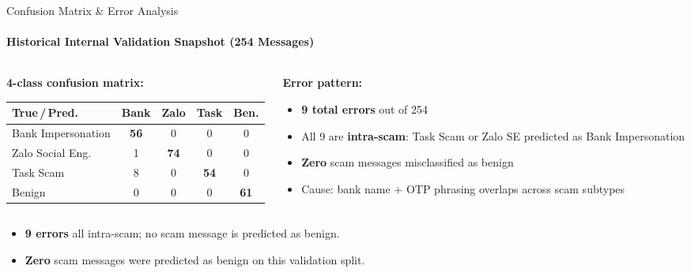 \begin{frame}{Confusion Matrix \& Error Analysis}
  \framesubtitle{Historical Internal Validation Snapshot (254 Messages)}
  \begin{columns}[T,onlytextwidth]
    \begin{column}{0.58\textwidth}
      {\footnotesize\textbf{4-class confusion matrix:}}\\[2pt]
      {\footnotesize
      \setlength{\tabcolsep}{4pt}
      \renewcommand{\arraystretch}{1.2}
      \begin{tabular}{lcccc}
        \toprule
        \textbf{True\,/\,Pred.} & \textbf{Bank} & \textbf{Zalo} & \textbf{Task} & \textbf{Ben.} \\
        \midrule
        Bank Impersonation & \cellcolor{CVBLUE!15}\textbf{56} & 0 & 0 & 0 \\
        Zalo Social Eng.   & 1 & \cellcolor{CVBLUE!15}\textbf{74} & 0 & 0 \\
        Task Scam          & 8 & 0 & \cellcolor{CVBLUE!15}\textbf{54} & 0 \\
        Benign             & 0 & 0 & 0 & \cellcolor{CVBLUE!15}\textbf{61} \\
        \bottomrule
      \end{tabular}}
    \end{column}
    \begin{column}{0.38\textwidth}
      {\footnotesize\textbf{Error pattern:}}\\[6pt]
      {\footnotesize
      \begin{itemize}
        \setlength{\itemsep}{0.3em}
        \item \textbf{9 total errors} out of 254
        \item All 9 are \textbf{intra-scam}: Task Scam or Zalo SE predicted as Bank Impersonation
        \item \textbf{Zero} scam messages misclassified as benign
        \item Cause: bank name + OTP phrasing overlaps across scam subtypes
      \end{itemize}}
    \end{column}
  \end{columns}
  \vspace{0.2cm}
  \begin{itemize}\footnotesize
    \item \textbf{9 errors} all intra-scam; no scam message is predicted as benign.
    \item \textbf{Zero} scam messages were predicted as benign on this validation split.
  \end{itemize}
\end{frame}
